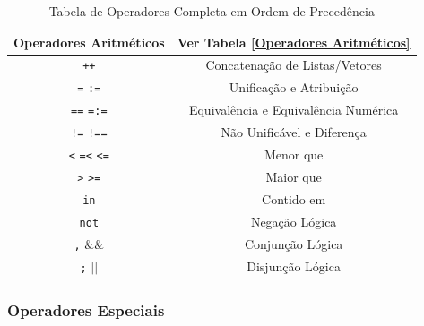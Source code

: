 \begin{frame}[fragile]

\begin{small}

	\begin{table}
		\caption{Tabela de Operadores Completa em Ordem de Precedência}
		\begin{center}
			\begin{tabular}{ c|c } \hline
				Operadores Aritméticos & Ver Tabela \ref{Operadores Aritméticos}\\ \hline
				\verb-++-  & Concatenação de Listas/Vetores \\ \hline 
				\verb+=+  \verb+:=+  & Unificação e Atribuição\\ \hline
				\verb+==+ \verb+=:=+ & Equivalência e Equivalência Numérica\\ \hline
				\verb+!=+ \verb+!==+ & Não Unificável e Diferença\\ \hline
				\verb+<+  \verb+=<+ \verb+<=+ & Menor que\\ \hline
				\verb+>+  \verb+>=+ & Maior que\\ \hline
				\verb+in+ & Contido em\\ \hline
				\verb+not+ & Negação Lógica \\ \hline 
				\verb+,+  $\&\&$ & Conjunção Lógica \\ \hline 
				\verb+;+  $|$$|$ & Disjunção Lógica \\ \hline 
			\end{tabular}
		\end{center}
	\end{table}

\end{small}

\end{frame}


\subsubsection{Operadores Especiais}

